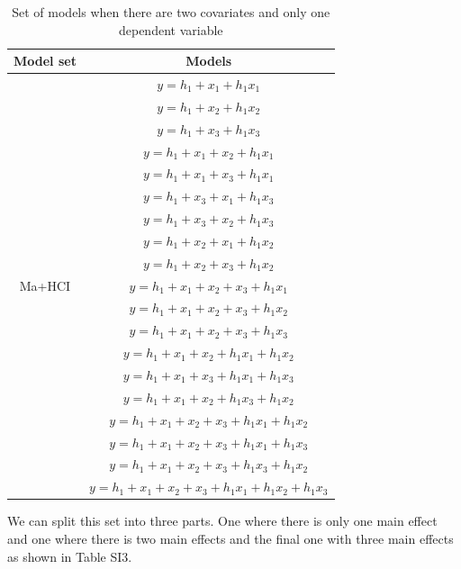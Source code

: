 \begin{table}[]
\caption{}
\caption*{\footnotesize Set of models when there are two covariates and only one dependent variable}
\centering
\begin{tabular}{cc}
\toprule
Model set & Models \\ 
\midrule
\multirow{19}{*}{Ma+HCI} & $y=h_1+x_1+h_1x_1$\\ &  $y=h_1+x_2+h_1x_2$\\ &  $y=h_1+x_3+h_1x_3$\\ & $y=h_1+x_1+x_2+h_1x_1$\\ & $y=h_1+x_1+x_3+h_1x_1$\\ & $y=h_1+x_3+x_1+h_1x_3$\\ & $y=h_1+x_3+x_2+h_1x_3$\\ & $y=h_1+x_2+x_1+h_1x_2$\\ & $y=h_1+x_2+x_3+h_1x_2$\\ & $y=h_1+x_1+x_2+x_3+h_1x_1$\\ & $y=h_1+x_1+x_2+x_3+h_1x_2$\\ & $y=h_1+x_1+x_2+x_3+h_1x_3$\\ & $y=h_1+x_1+x_2+h_1x_1+h_1x_2$\\ & $y=h_1+x_1+x_3+h_1x_1+h_1x_3$\\ & $y=h_1+x_1+x_2+h_1x_3+h_1x_2$\\ & $y=h_1+x_1+x_2+x_3+h_1x_1+h_1x_2$\\ & $y=h_1+x_1+x_2+x_3+h_1x_1+h_1x_3$\\ & $y=h_1+x_1+x_2+x_3+h_1x_3+h_1x_2$\\ & $y=h_1+x_1+x_2+x_3+h_1x_1+h_1x_2+h_1x_3$\\  
\bottomrule
\end{tabular}
\end{table}

We can split this set into three parts. One where there is only one main effect and one where there is two main effects and the final one with three main effects as shown in Table SI3.\\

